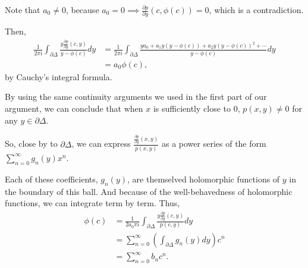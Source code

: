 \begin{sk}
	Note that $a_0 \neq 0$, because  $a_0 = 0 \implies {\frac{\partial p}{\partial y}(c, \phi(c))} = 0$, which is a contradiction.

	Then,
	\begin{align*}
		\frac{1}{2\pi i} \int_{\partial \Delta} \frac{y \frac{\partial p}{\partial y}(c,y)}{y-\phi(c)} dy
		&= \frac{1}{2\pi i} \int_{\partial \Delta} \frac{ya_0 + a_1y(y - \phi(c)) + a_2y(y - \phi(c))^2 + \cdots}{y-\phi(c)} dy \\
		&= a_0 \phi(c),
	\end{align*}
	by Cauchy's integral formula.

	By using the same continuity arguments we used in the first part of our argument, we can conclude that when $x$ is sufficiently close to $0$, $p(x, y) \neq 0$ for any $y \in \partial \Delta$.

	So, close by to $\partial \Delta$, we can express $\frac{\frac{\partial p}{\partial y}(x, y)}{p(x, y)}$ as a power series of the form $\sum_{n=0}^\infty g_n(y)x^n$.

	Each of these coefficients, $g_n(y)$, are themselved holomorphic functions of $y$ in the boundary of this ball. And because of the well-behavedness of holomorphic functions, we can integrate term by term. Thus, 
	\begin{align*}
		\phi(c)
		&= \frac{1}{2a_0\pi i} \int_{\partial \Delta} \frac{y \frac{\partial p}{\partial y}(c, y)}{p(c, y)} dy \\
		&= \sum_{n=0}^\infty \left( \int_{\partial\Delta} g_n(y) dy \right) c^n \\
		&= \sum_{n=0}^\infty b_nc^n. 
	\end{align*}
\end{sk}

